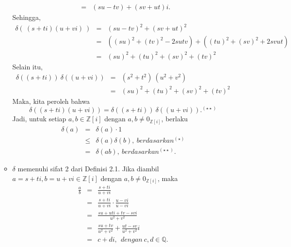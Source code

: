 \begin{enumerate}
\begin{itemize}
$$\begin{array}{rcl}
			&=& (su-tv) + (sv+ut)\textit{i}.
			\end{array}$$
		Sehingga, 
			$$\begin{array}{rcl}
			\delta (~(s+ t\textit{i})(u+ v\textit{i})~) &=& (su-tv)^2 + (sv+ut)^2\\
			&=& ((su)^2 +  (tv)^2-2sutv)+ ((tu)^2 +(sv)^2 +2svut)\\
			&=&  (su)^2 + (tu)^2 +(sv)^2 + (tv)^2
			\end{array}$$
		Selain itu,
			$$\begin{array}{rcl}
			\delta ((s+ t\textit{i}))~ \delta((u+ v\textit{i})) &=& (s^2 +t^2)~(u^2 + v^2)\\
			&=& (su)^2 + (tu)^2 +(sv)^2 + (tv)^2
			\end{array}$$
		Maka, kita peroleh bahwa $$\delta ((s+ t\textit{i})(u+ v\textit{i})) = \delta ((s+ t\textit{i}))~ \delta((u+ v\textit{i})).^{(\star \star )}$$
		Jadi, untuk setiap $a,b \in \mathbb{Z}[\textit{i}]$ dengan $a,b \ne 0_{\mathbb{Z}[\textit{i}]}$, berlaku
			$$\begin{array}{rcl}
			\delta (a) &=& \delta(a) \cdot 1\\
			&\le& \delta(a) \delta(b),~berdasarkan ^{(\star)}\\
			&=&  \delta(ab), ~berdasarkan ^{(\star \star)}.
			\end{array}$$
		\item $\delta$ memenuhi sifat 2 dari Definisi 2.1. Jika diambil $a=s + t\textit{i}, b= u + v\textit{i} \in \mathbb{Z}[\textit{i}]$ dengan $a,b \ne 0_{\mathbb{Z}[\textit{i}]}$, maka
			$$\begin{array}{rcl}
			\frac{a}{b}&=& \frac{s + t\textit{i}}{ u + v\textit{i}}\\
			&=& \frac{s + t\textit{i}}{ u + v\textit{i}} \cdot \frac{u - v\textit{i}}{ u - v\textit{i}}\\
			&=& \frac{su + ut\textit{i} + tv - sv\textit{i}}{ u^2 + v^2}\\
			&=& \frac{su+tv}{ u^2 + v^2} + \frac{ut-sv}{ u^2 + v^2} \textit{i}\\
			&=& c+d\textit{i},~~dengan~c,d \in \mathbb{Q}.
			\end{array}$$



\end{itemize}
\end{enumerate}
